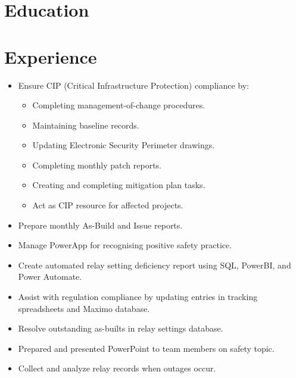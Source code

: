 \documentclass{lsanche_cv}
\begin{document}

\medskip


\smallskip


\begin{multicols*}{2}
  \section{Education}

  \section{Experience}
    \begin{itemize}
			\item Ensure CIP (Critical Infrastructure Protection) compliance by:
            \begin{itemize}
              \item Completing management-of-change procedures.
              \item Maintaining baseline records.
              \item Updating Electronic Security Perimeter drawings.
              \item Completing monthly patch reports.
              \item Creating and completing mitigation plan tasks.
              \item Act as CIP resource for affected projects.
            \end{itemize}
			\item Prepare monthly As-Build and Issue reports.
			\item Manage PowerApp for recognising positive safety practice.
			\item Create automated relay setting deficiency report using SQL, PowerBI, and Power Automate.
    \end{itemize}

	\divider

    \begin{itemize}
			\item Assist with regulation compliance by updating entries in tracking spreadsheets and Maximo database.
			\item Resolve outstanding as-builts in relay settings database.
			\item Prepared and presented PowerPoint to team members on safety topic.
			\item Collect and analyze relay records when outages occur.
    \end{itemize}


\end{multicols*}
\end{document}
